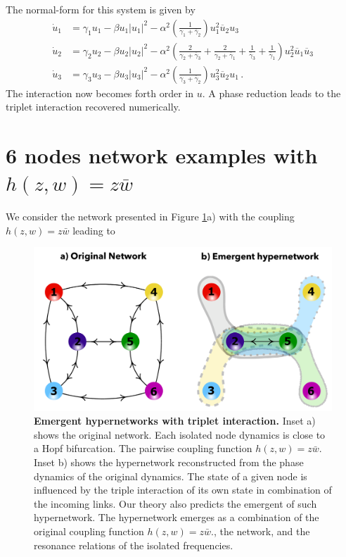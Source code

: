 \documentclass[12pt]{article}
\theoremstyle{plain}
\theoremstyle{definition}
\theoremstyle{remark}
\theoremstyle{remark}
\begin{document}
The normal-form for this system is given by
\begin{align}
\dot{u}_1 &= \gamma_1u_1 - \beta u_1|u_1|^2 - \alpha^2 \left(\frac{1}{\gamma_1 + \overline{\gamma}_2}\right)u_1^2\overline{u}_2u_3\\ \nonumber
\dot{u}_2 &= \gamma_2u_2 - \beta u_2|u_2|^2 -  \alpha^2 \left(\frac{2}{\gamma_2 + \overline{\gamma}_3} + \frac{2}{\gamma_2 + \overline{\gamma}_1} + \frac{1}{\overline{\gamma}_3} + \frac{1}{\overline{\gamma}_1}\right)u_2^2\overline{u}_1\overline{u}_3\\ \nonumber
\dot{u}_3 &= \gamma_3u_3 - \beta u_3|u_3|^2 -  \alpha^2 \left(\frac{1}{\gamma_3 + \overline{\gamma}_2}\right)u_3^2\overline{u}_2u_1\,  .
\end{align}
The interaction now becomes forth order in $u$. A phase reduction leads to the triplet interaction recovered numerically. 

\newpage

\section{6 nodes network examples with $h(z,w) = z \bar w$}\label{6n}
We consider the network presented in Figure \ref{fig:networks6n}a) with the coupling  $h(z,w) = z \bar w$ leading to 
\begin{figure}[!ht]
    \centering
    \includegraphics[width=0.65\columnwidth]{6nodes_network.pdf}
    \caption{{\bf Emergent hypernetworks with triplet interaction.} Inset a) shows the original network. Each isolated node dynamics is close to a Hopf bifurcation. The pairwise coupling function $h(z,w) = z \bar w$. Inset b) shows the hypernetwork reconstructed from the phase dynamics of the original dynamics. The state of a given node is influenced by the triple interaction of its own state in combination of the incoming links. Our theory also predicts the emergent of such hypernetwork. The hypernetwork  emerges as a combination of the original coupling function $h(z,w) = z \bar w. $, the network, and  the resonance relations of the isolated frequencies.}
    \label{fig:networks6n}
\end{figure}
\end{document}
